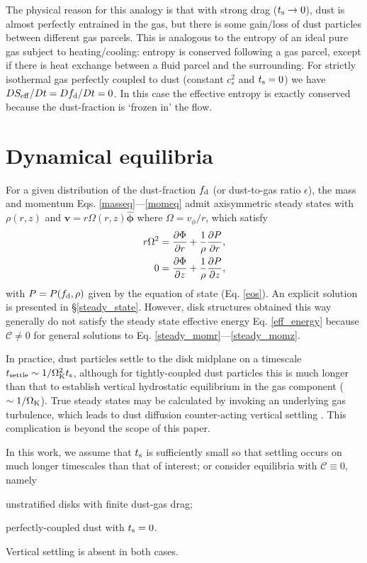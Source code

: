 The physical reason for this analogy is that with strong drag
($t_\mathrm{s}\to0$), dust is almost perfectly entrained in the gas, but
there is some gain/loss of dust particles between different  
gas parcels. This is analogous to the entropy of an ideal 
pure gas subject to heating/cooling: entropy is conserved following
a gas parcel, except if there is heat exchange between a fluid parcel and the
surrounding. For strictly isothermal gas perfectly coupled to dust
(constant $c_s^2$ and $t_\mathrm{s}=0$) we have 
$DS_\mathrm{eff}/ D t = Df_\mathrm{d}/D t=0$. In this case the effective 
entropy is exactly conserved because the dust-fraction is `frozen in' the
flow. 

\section{Dynamical equilibria}\label{eqm}
 
For a given distribution of the dust-fraction $f_\mathrm{d}$ (or
dust-to-gas ratio $\epsilon$), the 
mass and momentum Eqs. \ref{masseq}---\ref{momeq} admit     
axisymmetric steady states with $\rho(r,z)$ and 
$\bm{v}=r\Omega(r,z)\hat{\bm{\phi}}$ where $\Omega = v_\phi/r$, which satisfy 
\begin{align}
  r\Omega^2 &= \frac{\partial \Phi}{\partial r} + \frac{1}{\rho}\frac{\partial P}{\partial
    r},\label{steady_momr}\\
  0 & = \frac{\partial\Phi}{\partial z} + \frac{1}{\rho}\frac{\partial P}{\partial z},\label{steady_momz}
\end{align}
with $P=P(f_\mathrm{d},\rho)$ given by the equation of state
(Eq. \ref{eos}). An explicit solution is presented in
\S\ref{steady_state}.  
However, disk structures obtained this way generally do not satisfy 
the steady state effective energy Eq. \ref{eff_energy} because
$\mathcal{C}\neq0$ for general solutions to
Eq. \ref{steady_momr}---\ref{steady_momz}. 

In practice, dust particles settle to the disk midplane on a timescale 
$t_\mathrm{settle}\sim 1/\Omega_{\rm K}^2t_\mathrm{s}$, although for tightly-coupled dust
particles this is much longer than that to establish vertical
hydrostatic equilibrium in the gas component ($\sim 1/\Omega_{\rm K}$).  
True steady states may be calculated by invoking an underlying gas
turbulence, which leads to dust diffusion counter-acting vertical
settling \citep{takeuchi02, youdin07}. This complication is beyond the
scope of this paper.  

In this work, we assume that $t_\mathrm{s}$  is sufficiently small so
that settling occurs on much longer timescales  than that of interest; or
consider equilibria with $\mathcal{C}\equiv 0$, namely   
\begin{inparaenum}[1)] 
\item 
  unstratified disks with finite dust-gas drag; %
\item 
  perfectly-coupled dust with $t_\mathrm{s}=0$. %
\end{inparaenum} 
Vertical settling is absent in both cases. 

